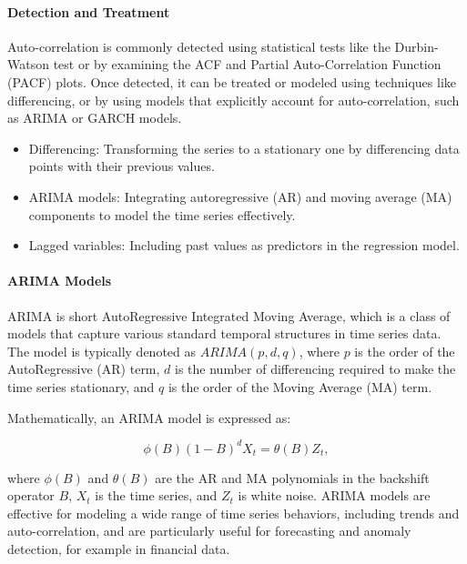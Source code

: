 \documentclass[12pt, twoside,hidelinks]{article}
\theoremstyle{definition}
\numberwithin{equation}{section}
\begin{document}
\paragraph{Detection and Treatment}

Auto-correlation is commonly detected using statistical tests like the Durbin-Watson test or by examining the ACF and Partial Auto-Correlation Function (PACF) plots. Once detected, it can be treated or modeled using techniques like differencing, or by using models that explicitly account for auto-correlation, such as ARIMA or GARCH models.


\begin{itemize}
  \item Differencing: Transforming the series to a stationary one by differencing data points with their previous values.
  \item ARIMA models: Integrating autoregressive (AR) and moving average (MA) components to model the time series effectively.
  \item Lagged variables: Including past values as predictors in the regression model.
\end{itemize}


\paragraph{ARIMA Models}

ARIMA is short AutoRegressive Integrated Moving Average, which is a class of models that capture various standard temporal structures in time series data. The model is typically denoted as \(ARIMA(p, d, q)\), where \(p\) is the order of the AutoRegressive (AR) term, \(d\) is the number of differencing required to make the time series stationary, and \(q\) is the order of the Moving Average (MA) term.

Mathematically, an ARIMA model is expressed as:

\begin{equation}
    \phi(B)(1-B)^d X_t = \theta(B)Z_t,
    \label{eq:arima}
\end{equation}

where \( \phi(B) \) and \( \theta(B) \) are the AR and MA polynomials in the backshift operator \( B \), \( X_t \) is the time series, and \( Z_t \) is white noise. ARIMA models are effective for modeling a wide range of time series behaviors, including trends and auto-correlation, and are particularly useful for forecasting and anomaly detection, for example in financial data.
\end{document}
